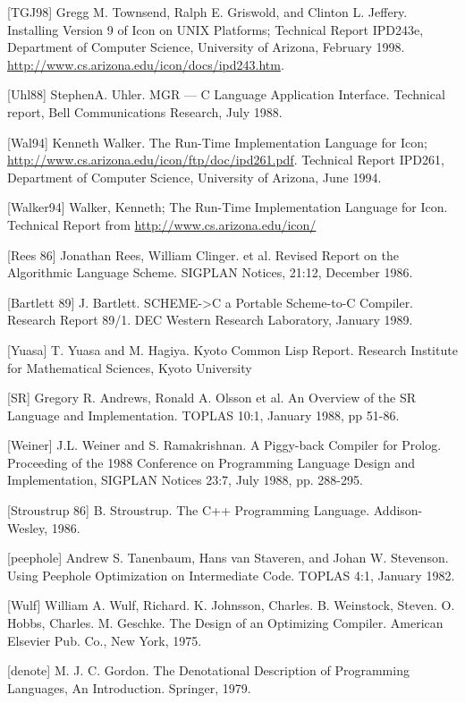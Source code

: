 [TGJ98] Gregg M. Townsend, Ralph E. Griswold, and Clinton
L. Jeffery. Installing Version 9 of Icon on UNIX Platforms; Technical
Report IPD243e, Department of Computer Science, University of Arizona,
February 1998.\newline
\url{http://www.cs.arizona.edu/icon/docs/ipd243.htm}.

[Uhl88] StephenA. Uhler. MGR --- C Language Application
Interface. Technical report, Bell Communications Research, July 1988.

[Wal94] Kenneth Walker. The Run-Time Implementation Language for Icon;
\url{http://www.cs.arizona.edu/icon/ftp/doc/ipd261.pdf}. Technical
Report IPD261, Department of Computer Science, University of Arizona,
June 1994.

[Walker94] Walker, Kenneth; The Run-Time Implementation Language for
Icon. Technical Report from \url{http://www.cs.arizona.edu/icon/}

[Rees 86] Jonathan Rees, William Clinger. et al. Revised Report on the
Algorithmic Language Scheme. SIGPLAN Notices, 21:12, December 1986.

[Bartlett 89] J. Bartlett. SCHEME-{\textgreater}C a Portable
Scheme-to-C Compiler. Research Report 89/1. DEC Western Research
Laboratory, January 1989.

[Yuasa] T. Yuasa and M. Hagiya. Kyoto Common Lisp Report. Research
Institute for Mathematical Sciences, Kyoto University

[SR] Gregory R. Andrews, Ronald A. Olsson et al. An Overview of the SR
Language and Implementation. TOPLAS 10:1, January 1988, pp 51-86.

[Weiner] J.L. Weiner and S. Ramakrishnan. A Piggy-back Compiler for
Prolog. Proceeding of the 1988 Conference on Programming Language
Design and Implementation, SIGPLAN Notices 23:7, July 1988,
pp. 288-295.

[Stroustrup 86] B. Stroustrup. The C++ Programming
Language. Addison-Wesley, 1986.

[peephole] Andrew S. Tanenbaum, Hans van Staveren, and Johan
W. Stevenson. Using Peephole Optimization on Intermediate Code. TOPLAS
4:1, January 1982.

[Wulf] William A. Wulf, Richard. K. Johnsson, Charles. B. Weinstock,
Steven. O. Hobbs, Charles. M. Geschke. The Design of an Optimizing
Compiler. American Elsevier Pub. Co., New York, 1975.

[denote] M. J. C. Gordon. The Denotational Description of Programming
Languages, An Introduction. Springer, 1979.

